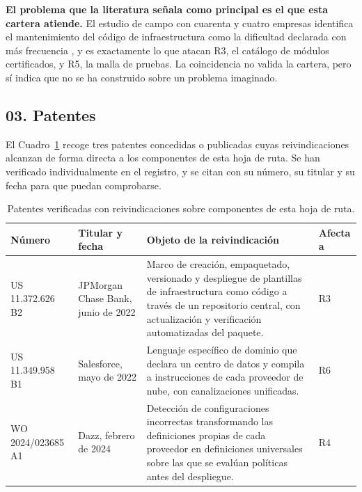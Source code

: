\documentclass[11pt,letterpaper]{article}
\newcommand{\subsec}[1]{%
  \subsection*{#1}%
  \phantomsection\addcontentsline{toc}{subsection}{#1}}
\begin{document}
\textbf{El problema que la literatura señala como principal es el que esta
cartera atiende.} El estudio de campo con cuarenta y cuatro empresas
identifica el mantenimiento del código de infraestructura como la dificultad
declarada con más frecuencia \parencite{guerriero2019}, y es exactamente lo
que atacan R3, el catálogo de módulos certificados, y R5, la malla de pruebas.
La coincidencia no valida la cartera, pero sí indica que no se ha construido
sobre un problema imaginado.

\subsec{03. Patentes}

El Cuadro~\ref{tab:patentes} recoge tres patentes concedidas o publicadas
cuyas reivindicaciones alcanzan de forma directa a los componentes de esta
hoja de ruta. Se han verificado individualmente en el registro, y se citan con
su número, su titular y su fecha para que puedan comprobarse.

\begin{table}[htbp]
  \centering
  \footnotesize
  \setlength{\tabcolsep}{4pt}
  \caption{Patentes verificadas con reivindicaciones sobre componentes de esta
  hoja de ruta.}
  \label{tab:patentes}
  \begin{tabularx}{\textwidth}{@{}l>{\raggedright\arraybackslash}p{}
    >{\raggedright\arraybackslash}X l@{}}
    \toprule
    \textbf{Número} & \textbf{Titular y fecha} & \textbf{Objeto de la
      reivindicación} & \textbf{Afecta a} \\
    \midrule
    US 11.372.626 B2 \parencite{us11372626} & JPMorgan Chase Bank, junio de
      2022 & Marco de creación, empaquetado, versionado y despliegue de
      plantillas de infraestructura como código a través de un repositorio
      central, con actualización y verificación automatizadas del paquete. &
      R3 \\
    US 11.349.958 B1 \parencite{us11349958} & Salesforce, mayo de 2022 &
      Lenguaje específico de dominio que declara un centro de datos y compila
      a instrucciones de cada proveedor de nube, con canalizaciones
      unificadas. & R6 \\
    WO 2024/023685 A1 \parencite{wo2024023685} & Dazz, febrero de 2024 &
      Detección de configuraciones incorrectas transformando las definiciones
      propias de cada proveedor en definiciones universales sobre las que se
      evalúan políticas antes del despliegue. & R4 \\
    \bottomrule
  \end{tabularx}
\end{table}
\end{document}
